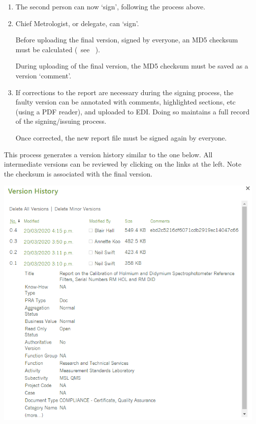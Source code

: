 {\begin{enumerate}
Note,
\begin{itemize}
\item the file name must remain unchanged (EDI maintains a version history based on file name)
\item it is not necessary to initial each page (as is done with paper reports)
\item for technical reasons, the document must be opened with a PDF reader running on a local machine (it is not possible to sign and re-store the document directly from a browser)
\end{itemize}

\item The second person can now `sign', following the process above.
\item Chief Metrologist, or delegate, can `sign'. 

Before uploading the final version, signed by everyone, an MD5 checksum must be calculated (~see \cite[\S\ref*{GRP-ss:file_integrity_md5}]{MSL_Reporting_Guidelines}~). 

During uploading of the final version, the MD5 checksum must be saved as a version `comment'. 

\item If corrections to the report are necessary during the signing process, the faulty version can be annotated with comments, highlighted sections, etc (using a PDF reader), and uploaded to EDI. Doing so maintains a full record of the signing/issuing process. 

Once corrected, the new report file must be signed again by everyone.
\end{enumerate}

This process generates a version history similar to the one below. All intermediate versions can be reviewed by clicking on the links at the left. Note the checksum is associated with the final version.

\begin{center}
\includegraphics[scale=.6]{pictures/version_history_report}
\end{center}
}
